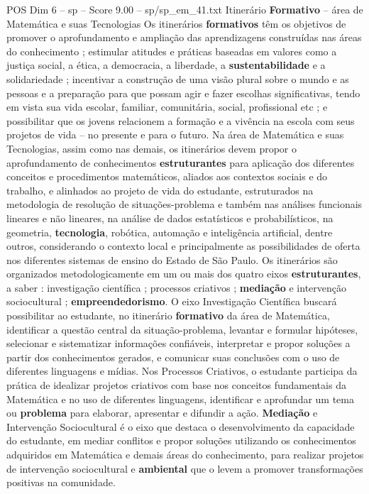 \begin{textsample}{POS Dim 6 – sp – Score 9.00 – sp/sp\_em\_41.txt}  \label{ex:f6_pos_084}
Itinerário \textbf{Formativo} – área de Matemática e suas Tecnologias Os itinerários \textbf{formativos} têm os objetivos de promover o aprofundamento e ampliação das aprendizagens construídas nas áreas do conhecimento ; estimular atitudes e práticas baseadas em valores como a justiça social, a ética, a democracia, a liberdade, a \textbf{sustentabilidade} e a solidariedade ; incentivar a construção de uma visão plural sobre o mundo e as pessoas e a preparação para que possam agir e fazer escolhas significativas, tendo em vista sua vida escolar, familiar, comunitária, social, profissional etc ; e possibilitar que os jovens relacionem a formação e a vivência na escola com seus projetos de vida – no presente e para o futuro.
Na área de Matemática e suas Tecnologias, assim como nas demais, os itinerários devem propor o aprofundamento de conhecimentos \textbf{estruturantes} para aplicação dos diferentes conceitos e procedimentos matemáticos, aliados aos contextos sociais e do trabalho, e alinhados ao projeto de vida do estudante, estruturados na metodologia de resolução de situações-problema e também nas análises funcionais lineares e não lineares, na análise de dados estatísticos e probabilísticos, na geometria, \textbf{tecnologia}, robótica, automação e inteligência artificial, dentre outros, considerando o contexto local e principalmente as possibilidades de oferta nos diferentes sistemas de ensino do Estado de São Paulo.
Os itinerários são organizados metodologicamente em um ou mais dos quatro eixos \textbf{estruturantes}, a saber : investigação científica ; processos criativos ; \textbf{mediação} e intervenção sociocultural ; \textbf{empreendedorismo}.
O eixo Investigação Científica buscará possibilitar ao estudante, no itinerário \textbf{formativo} da área de Matemática, identificar a questão central da situação-problema, levantar e formular hipóteses, selecionar e sistematizar informações confiáveis, interpretar e propor soluções a partir dos conhecimentos gerados, e comunicar suas conclusões com o uso de diferentes linguagens e mídias.
Nos Processos Criativos, o estudante participa da prática de idealizar projetos criativos com base nos conceitos fundamentais da Matemática e no uso de diferentes linguagens, identificar e aprofundar um tema ou \textbf{problema} para elaborar, apresentar e difundir a ação. \textbf{Mediação} e Intervenção Sociocultural é o eixo que destaca o desenvolvimento da capacidade do estudante, em mediar conflitos e propor soluções utilizando os conhecimentos adquiridos em Matemática e demais áreas do conhecimento, para realizar projetos de intervenção sociocultural e \textbf{ambiental} que o levem a promover transformações positivas na comunidade.

\end{textsample}
